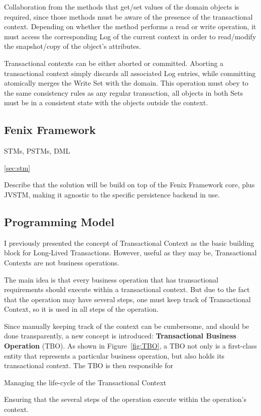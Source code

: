 \documentclass{llncs}
\begin{document}
Collaboration from the methods that get/set values of the domain
objects is required, since those methods must be aware of the presence
of the transactional context. Depending on whether the method performs
a read or write operation, it must access the corresponding Log of the
current context in order to read/modify the snapshot/copy of the
object's attributes.

Transactional contexts can be either aborted or committed. Aborting a
transactional context simply discards all associated Log entries,
while committing atomically merges the Write Set with the domain. This
operation must obey to the same consistency rules as any regular
transaction, all objects in both Sets must be in a consistent state
with the objects outside the context.

\subsection{Fenix Framework}

STMs, PSTMs, DML

\ref{sec:stm}

\cite{cachopo2006versioned}

Describe that the solution will be build on top of the Fenix Framework
core, plus JVSTM, making it agnostic to the specific persistence
backend in use.

\subsection{Programming Model}

I previously presented the concept of Transactional Context as the
basic building block for Long-Lived Transactions. However, useful as
they may be, Transactional Contexts are not business operations.

The main idea is that every business operation that has transactional
requirements should execute within a transactional context. But due to
the fact that the operation may have several steps, one must keep
track of Transactional Context, so it is used in all steps of the
operation.

Since manually keeping track of the context can be cumbersome, and
should be done transparently, a new concept is introduced: {\bf
  Transactional Business Operation} (TBO). As shown in
Figure~\ref{fig:TBO}, a TBO not only is a first-class entity that
represents a particular business operation, but also holds its
transactional context. The TBO is then responsible for
\begin{inparaenum}[\itshape 1\upshape)]
\item Managing the life-cycle of the Transactional Context
\item Ensuring that the several steps of the operation execute within
  the operation's context.
\end{inparaenum}
\end{document}
